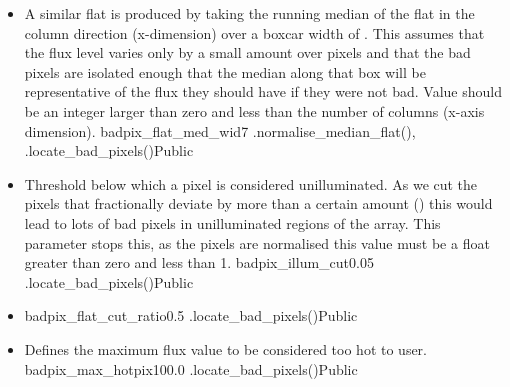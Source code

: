 \begin{itemize}

	\item \label{text:badpix_flat_med_wid} 
	{A similar flat is produced by taking the running median of the flat in the column direction (x-dimension) over a boxcar width of . This assumes that the flux level varies only by a small amount over  pixels and that the bad pixels are isolated enough that the median along that box will be representative of the flux they should have if they were not bad. Value should be an integer larger than zero and less than the number of columns (x-axis dimension).}
	{badpix\_flat\_med\_wid}{7}
	{\calbadpix}{\constantsfile}{\spirouImage.normalise\_median\_flat(), \spirouImage.locate\_bad\_pixels()}{Public}

	\item {}
	{Threshold below which a pixel is considered unilluminated. As we cut the pixels that fractionally deviate by more than a certain amount () this would lead to lots of bad pixels in unilluminated regions of the array. This parameter stops this, as the pixels are normalised this value must be a float greater than zero and less than 1.}
	{badpix\_illum\_cut}{0.05}
	{\calbadpix}{\constantsfile}{\spirouImage.locate\_bad\_pixels()}{Public}

	\item \label{text:badpix_flat_cut_ratio} 
	{badpix\_flat\_cut\_ratio}{0.5}
	{\calbadpix}{\constantsfile}{\spirouImage.locate\_bad\_pixels()}{Public}

	\item {}
	{Defines the maximum flux value to be considered too hot to user.}
	{badpix\_max\_hotpix}{100.0}
	{\calbadpix}{\constantsfile}{\spirouImage.locate\_bad\_pixels()}{Public}

\end{itemize}









